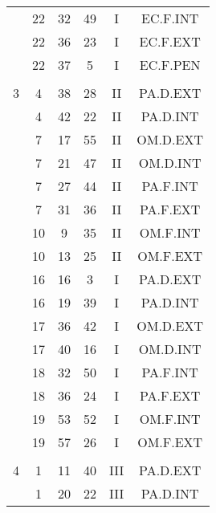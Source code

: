 \documentclass[12pt, a4paper]{article}
\begin{document}
\begin{multicols}{3}
{\begin{tabular}{c c c c c c}
	 	 	 	 & 22 & 32 & 49 & I & EC.F.INT\\%
	 	 	 	 & 22 & 36 & 23 & I & EC.F.EXT\\%
	 	 	 	 & 22 & 37 & 5 & I & EC.F.PEN\\%
	 	 	 	 & & & & & \\%
	 	 	 	3 & 4 & 38 & 28 & II & PA.D.EXT\\%
	 	 	 	 & 4 & 42 & 22 & II & PA.D.INT\\%
	 	 	 	 & 7 & 17 & 55 & II & OM.D.EXT\\%
	 	 	 	 & 7 & 21 & 47 & II & OM.D.INT\\%
	 	 	 	 & 7 & 27 & 44 & II & PA.F.INT\\%
	 	 	 	 & 7 & 31 & 36 & II & PA.F.EXT\\%
	 	 	 	 & 10 & 9 & 35 & II & OM.F.INT\\%
	 	 	 	 & 10 & 13 & 25 & II & OM.F.EXT\\%
	 	 	 	 & 16 & 16 & 3 & I & PA.D.EXT\\%
	 	 	 	 & 16 & 19 & 39 & I & PA.D.INT\\%
	 	 	 	 & 17 & 36 & 42 & I & OM.D.EXT\\%
	 	 	 	 & 17 & 40 & 16 & I & OM.D.INT\\%
	 	 	 	 & 18 & 32 & 50 & I & PA.F.INT\\%
	 	 	 	 & 18 & 36 & 24 & I & PA.F.EXT\\%
	 	 	 	 & 19 & 53 & 52 & I & OM.F.INT\\%
	 	 	 	 & 19 & 57 & 26 & I & OM.F.EXT\\%
	 	 	 	 & & & & & \\%
	 	 	 	4 & 1 & 11 & 40 & III & PA.D.EXT\\%
	 	 	 	 & 1 & 20 & 22 & III & PA.D.INT\\%

\end{tabular}}
\end{multicols}
\end{document}
